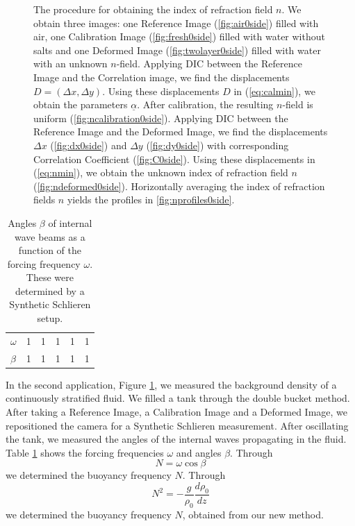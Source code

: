 \documentclass[draft]{svjour3}                     %
\begin{document}
\begin{figure}[htbp]
\caption{The procedure for obtaining the index of refraction field $n$. We obtain three images: one Reference Image (\ref{fig:air0side}) filled with air, one Calibration Image (\ref{fig:fresh0side}) filled with water without salts and one Deformed Image (\ref{fig:twolayer0side}) filled with water with an unknown $n$-field. Applying DIC between the Reference Image and the Correlation image, we find the displacements $D=(\Delta x, \Delta y)$. Using these displacements $D$ in (\ref{eq:calmin}), we obtain the parameters $\underline{\alpha}$. After calibration, the resulting $n$-field is uniform (\ref{fig:ncalibration0side}). Applying DIC between the Reference Image and the Deformed Image, we find the displacements $\Delta x$ (\ref{fig:dx0side}) and $\Delta y$ (\ref{fig:dy0side}) with corresponding Correlation Coefficient (\ref{fig:C0side}).  Using these displacements in (\ref{eq:nmin}), we obtain the unknown index of refraction field $n$ (\ref{fig:ndeformed0side}). Horizontally averaging the index of refraction fields $n$ yields the profiles in \ref{fig:nprofiles0side}.}
\label{fig:0side}
\end{figure}

\begin{table}[htbp]
\caption{Angles $\beta$ of internal wave beams as a function of the forcing frequency $\omega$. These were determined by a Synthetic Schlieren setup.}
\label{tab:SSintwav}
\centering
\begin{tabular}{llllll}
$\omega$ & 1 & 1 & 1 & 1 & 1  \\
$\beta$  & 1 & 1 & 1 & 1 & 1
\end{tabular}
\end{table}

In the second application, Figure \ref{fig:0side}, we measured the background density of a continuously stratified fluid. We filled a tank through the double bucket method. After taking a Reference Image, a Calibration Image and a Deformed Image, we repositioned the camera for a Synthetic Schlieren measurement. After oscillating the tank, we measured the angles of the internal waves propagating in the fluid. Table \ref{tab:SSintwav} shows the forcing frequencies $\omega$ and angles $\beta$. Through
\begin{equation}
	N = \omega \cos \beta
\end{equation}
we determined the buoyancy frequency $N$. Through
\begin{equation}
	N^2 = - \frac{g}{\rho_0}\frac{d \rho_0}{d z}
\end{equation}
we determined the buoyancy frequency $N$, obtained from our new method. 
\end{document}

